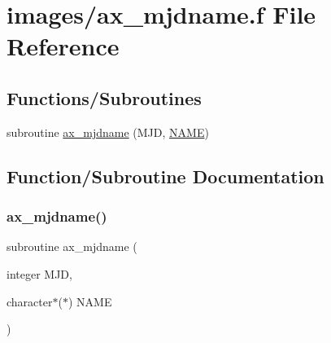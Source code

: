 \hypertarget{ax__mjdname_8f}{}\section{images/ax\+\_\+mjdname.f File Reference}
\label{ax__mjdname_8f}
\subsection*{Functions/\+Subroutines}
\begin{DoxyCompactItemize}
\item 
subroutine \hyperlink{ax__mjdname_8f_a8bc4c4708812ca53f512798b3bd2bbb0}{ax\+\_\+mjdname} (M\+JD, \hyperlink{inflate_8h_a164ea0159d5f0b5f12a646f25f99eceaa67bc2ced260a8e43805d2480a785d312}{N\+A\+ME})
\end{DoxyCompactItemize}


\subsection{Function/\+Subroutine Documentation}
\mbox{\label{ax__mjdname_8f_a8bc4c4708812ca53f512798b3bd2bbb0}} 
\subsubsection{\texorpdfstring{ax\+\_\+mjdname()}{ax\_mjdname()}}
{\footnotesize\ttfamily subroutine ax\+\_\+mjdname (\begin{DoxyParamCaption}\item[{integer}]{M\+JD,  }\item[{character$\ast$($\ast$)}]{N\+A\+ME }\end{DoxyParamCaption})}


